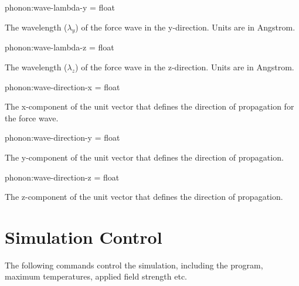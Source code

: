 {\zicf phonon:wave-lambda-y = float}
The wavelength ($\lambda_y$) of the force wave in the y-direction. Units are in Angstrom.

{\zicf phonon:wave-lambda-z = float}
The wavelength ($\lambda_z$) of the force wave in the z-direction. Units are in Angstrom.

{\zicf phonon:wave-direction-x = float} The x-component of the unit vector that defines the direction of propagation for the force wave.

{\zicf phonon:wave-direction-y = float} The y-component of the unit vector that defines the direction of propagation.

{\zicf phonon:wave-direction-z = float} The z-component of the unit vector that defines the direction of propagation.







\section*{Simulation Control}
The following commands control the simulation, including the program, maximum temperatures, applied field strength etc.

